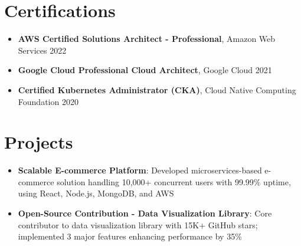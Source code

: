 \documentclass[a4paper,10pt]{article}
\begin{document}
\section*{Certifications}

\begin{itemize}
    \item {\bfseries AWS Certified Solutions Architect - Professional}, Amazon Web Services \hfill 2022
    
    \item {\bfseries Google Cloud Professional Cloud Architect}, Google Cloud \hfill 2021
    
    \item {\bfseries Certified Kubernetes Administrator (CKA)}, Cloud Native Computing Foundation \hfill 2020
\end{itemize}

\section*{Projects}

\begin{itemize}
    \item {\bfseries Scalable E-commerce Platform}: Developed microservices-based e-commerce solution handling 10,000+ concurrent users with 99.99\% uptime, using React, Node.js, MongoDB, and AWS
    
    \item {\bfseries Open-Source Contribution - Data Visualization Library}: Core contributor to data visualization library with 15K+ GitHub stars; implemented 3 major features enhancing performance by 35\%
\end{itemize}
\end{document}
